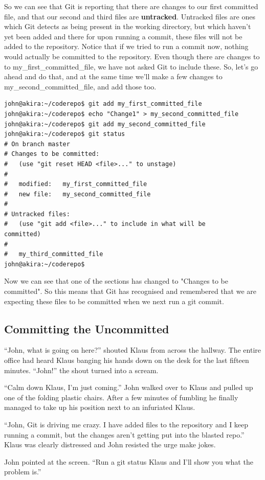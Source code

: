 So we can see that Git is reporting that there are changes to our first committed file, and that our second and third files are \textbf{untracked}.  Untracked files are ones which Git detects as being present in the working directory, but which haven't yet been added and there for upon running a commit, these files will not be added to the repository.  Notice that if we tried to run a commit now, nothing would actually be committed to the repository.  Even though there are changes to to my\_first\_committed\_file, we have not asked Git to include these.  So, let's go ahead and do that, and at the same time we'll make a few changes to my\_second\_committed\_file, and add those too.

\begin{Verbatim}[frame=leftline,framerule=1mm,fontsize=\relsize{-3}] 
john@akira:~/coderepo$ git add my_first_committed_file
john@akira:~/coderepo$ echo "Change1" > my_second_committed_file 
john@akira:~/coderepo$ git add my_second_committed_file
john@akira:~/coderepo$ git status
# On branch master
# Changes to be committed:
#   (use "git reset HEAD <file>..." to unstage)
#
#	modified:   my_first_committed_file
#	new file:   my_second_committed_file
#
# Untracked files:
#   (use "git add <file>..." to include in what will be 
committed)
#
#	my_third_committed_file
john@akira:~/coderepo$ 
\end{Verbatim} 

Now we can see that one of the sections has changed to "Changes to be committed".  So this means that Git has recognised and remembered that we are expecting these files to be committed when we next run a git commit.  

\subsection{Committing the Uncommitted}

\begin{trenches}
``John, what is going on here?'' shouted Klaus from across the hallway.  The entire office had heard Klaus banging his hands down on the desk for the last fifteen minutes.  ``John!'' the shout turned into a scream.

``Calm down Klaus, I'm just coming.''  John walked over to Klaus and pulled up one of the folding plastic chairs.  After a few minutes of fumbling he finally managed to take up his position next to an infuriated Klaus.

``John, Git is driving me crazy.  I have added files to the repository and I keep running a commit, but the changes aren't getting put into the blasted repo.''  Klaus was clearly distressed and John resisted the urge make jokes.

John pointed at the screen.  ``Run a git status Klaus and I'll show you what the problem is.''
\end{trenches}

